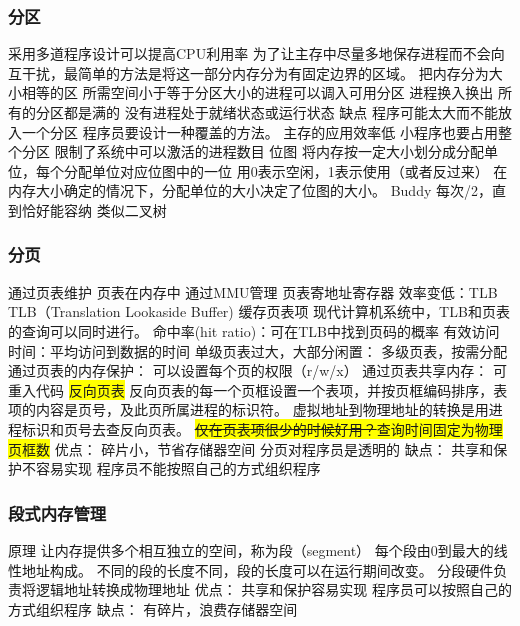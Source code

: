 \documentclass{ctexart}
\newcommand{\hl}[1]{\colorbox{yellow}{#1}}
\begin{document}
\subsubsection{分区}
\begin{outline}
    \1 采用多道程序设计可以提高CPU利用率
    \1 为了让主存中尽量多地保存进程而不会向互干扰，最简单的方法是将这一部分内存分为有固定边界的区域。
    \1 把内存分为大小相等的区
    \1 所需空间小于等于分区大小的进程可以调入可用分区
    \1 进程换入换出
        \2  所有的分区都是满的
        \2 没有进程处于就绪状态或运行状态
    \1 缺点
        \2 程序可能太大而不能放入一个分区
            \3 程序员要设计一种覆盖的方法。
        \2 主存的应用效率低
            \3 小程序也要占用整个分区
        \2 限制了系统中可以激活的进程数目
\1 位图
    \1 将内存按一定大小划分成分配单位，每个分配单位对应位图中的一位
    \1 用0表示空闲，1表示使用（或者反过来）
    \1 在内存大小确定的情况下，分配单位的大小决定了位图的大小。
\1 Buddy
    \1 每次/2，直到恰好能容纳
    \1 类似二叉树
\end{outline}
\subsubsection{分页}
\begin{outline}
    \1 通过页表维护
    \1 页表在内存中
    \1 通过MMU管理
        \2 页表寄地址寄存器
        \2 效率变低：TLB
    \1 TLB（Translation Lookaside Buffer)
        \2 缓存页表项
        \2 现代计算机系统中，TLB和页表的查询可以同时进行。
        \2 命中率(hit ratio)：可在TLB中找到页码的概率
        \2 有效访问时间：平均访问到数据的时间
    \1 单级页表过大，大部分闲置：
        \2 多级页表，按需分配
    \1 通过页表的内存保护：
        \2 可以设置每个页的权限（r/w/x）
    \1 通过页表共享内存：
        \2 可重入代码
    \1 \hl{反向页表}
        \2 反向页表的每一个页框设置一个表项，并按页框编码排序，表项的内容是页号，及此页所属进程的标识符。
        \2 虚拟地址到物理地址的转换是用进程标识和页号去查反向页表。
        \2 \hl{\sout{仅在页表项很少的时候好用？}查询时间固定为物理页框数}
    \1 优点：
        \2 碎片小，节省存储器空间
        \2 分页对程序员是透明的
    \1 缺点：
        \2 共享和保护不容易实现
        \2 程序员不能按照自己的方式组织程序
    \end{outline}
\subsubsection{段式内存管理}
\begin{outline}
    \1 原理
        \2 让内存提供多个相互独立的空间，称为段（segment）
        \2 每个段由0到最大的线性地址构成。
        \2 不同的段的长度不同，段的长度可以在运行期间改变。
    \1 分段硬件负责将逻辑地址转换成物理地址
    \1 优点：
        \2 共享和保护容易实现
        \2 程序员可以按照自己的方式组织程序
    \1 缺点：
        \2 有碎片，浪费存储器空间
\end{outline}
\end{document}
